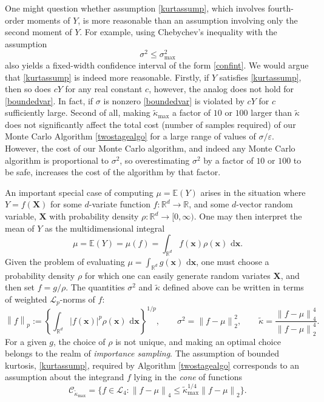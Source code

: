 \documentclass[graybox]{svmult}
\newcommand\reals{\mathbb{R}}
\newcommand\e{\mathbb{E}}
\newcommand{\vx}{\boldsymbol{x}}
\newcommand{\vX}{\boldsymbol{X}}
\newcommand{\rd}{\,\mathrm{d}}
\newcommand{\abs}[1]{\left|#1\right|}
\newcommand{\dif}{\rd}
\newcommand{\tkappa}{\tilde{\kappa}}
\newcommand{\cc}{\mathcal{C}}
\newcommand{\cl}{\mathcal{L}}
\def\abs#1{\ensuremath{\left \lvert #1 \right \rvert}}
\newcommand{\norm}[2][{}]{\ensuremath{\left \lVert #2 \right \rVert}_{#1}}
\begin{document}
One might question whether assumption \eqref{kurtassump}, which involves fourth-order moments of $Y$, is more reasonable than an assumption involving only the second moment of $Y$.  For example, using Chebychev's inequality with the assumption 
\begin{equation} \label{boundedvar}
\sigma^2 \le \sigma^2_{\max}
\end{equation}
also yields a fixed-width confidence interval of the form \eqref{confint}.  We would argue that \eqref{kurtassump} is indeed more reasonable.  Firstly, if $Y$ satisfies \eqref{kurtassump}, then so does $cY$ for any real constant $c$, however, the analog does not hold for \eqref{boundedvar}.  In fact, if $\sigma$ is nonzero \eqref{boundedvar} is violated by $cY$ for $c$ sufficiently large.  Second of all, making $\tkappa_{\max}$ a factor of $10$ or $100$ larger than $\tkappa$ does not significantly affect the total cost (number of samples required) of our Monte Carlo Algorithm \ref{twostagealgo} for a large range of values of $\sigma/\varepsilon$.  However, the cost of our Monte Carlo algorithm, and indeed any Monte Carlo algorithm is proportional to $\sigma^2$, so overestimating $\sigma^2$ by a factor of $10$ or $100$ to be safe, increases the cost of the algorithm by that factor. 

An important special case of computing $\mu=\e(Y)$ arises in the situation where $Y=f(\vX)$ for some  $d$-variate function $f: \reals^d \to \reals$, and some $d$-vector random variable, $\vX$ with probability density $\rho: \reals^d \to [0,\infty)$.  One may then interpret the mean of $Y$ as the multidimensional integral 
\begin{equation} \label{muintegral}
\mu=\e(Y)= \mu(f) = \int_{\reals^d} f(\vx) \rho(\vx) \, \dif \vx.
\end{equation}
Given the problem of evaluating $\mu=\int_{\reals^d} g(\vx) \, \dif \vx$, one must choose a probability density $\rho$ for which one can easily generate random variates $\vX$, and then set $f = g/\rho$.  The quantities $\sigma^2$ and $\tkappa$ defined above can be written in terms of weighted $\cl_p$-norms of $f$:
\begin{equation} \label{Lpnormdef}
\norm[p]{f} :=\left\{\int_{\reals^d} \abs{f(\vx)}^p \rho(\vx) \, \dif \vx\right\}^{1/p}, \qquad
\sigma^2 = \norm[2]{f-\mu}^2, \qquad \tkappa = \frac{\norm[4]{f-\mu}^4}{\norm[2]{f-\mu}^4}.
\end{equation}
For a given $g$, the choice of $\rho$ is not unique, and making an optimal choice belongs to the realm of \emph{importance sampling}. The assumption of bounded kurtosis, \eqref{kurtassump}, required by Algorithm \ref{twostagealgo} corresponds to an assumption about the integrand $f$ lying in the \emph{cone} of functions
\begin{equation} \label{conedef}
\cc_{\tkappa_{\max}} = \{ f \in \cl_4 : \norm[4]{f-\mu} \le \tkappa_{\max}^{1/4} \norm[2]{f-\mu} \}.
\end{equation}
\end{document}
